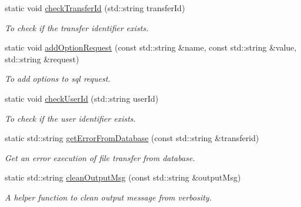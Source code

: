 \begin{DoxyCompactItemize}
static void \hyperlink{classFileTransferServer_a73de2897fd2e10695fc8cbfa0a1f4446}{checkTransferId} (std::string transferId)
\begin{DoxyCompactList}\small\item\em To check if the transfer identifier exists. \item\end{DoxyCompactList}\item 
static void \hyperlink{classFileTransferServer_a50d3535fc7434b2d94b4e70256fe752f}{addOptionRequest} (const std::string \&name, const std::string \&value, std::string \&request)
\begin{DoxyCompactList}\small\item\em To add options to sql request. \item\end{DoxyCompactList}\item 
static void \hyperlink{classFileTransferServer_af0dbce6cdaeaf7fd5df4cd19c9b51222}{checkUserId} (std::string userId)
\begin{DoxyCompactList}\small\item\em To check if the user identifier exists. \item\end{DoxyCompactList}\item 
static std::string \hyperlink{classFileTransferServer_a45145cc8d6a5ef953ec040f834efa609}{getErrorFromDatabase} (const std::string \&transferid)
\begin{DoxyCompactList}\small\item\em Get an error execution of file transfer from database. \item\end{DoxyCompactList}\item 
static std::string \hyperlink{classFileTransferServer_a6ee07b8fe009fe330bee05339f1b0b1d}{cleanOutputMsg} (const std::string \&outputMsg)
\begin{DoxyCompactList}\small\item\em A helper function to clean output message from verbosity. \item\end{DoxyCompactList}\end{DoxyCompactItemize}
